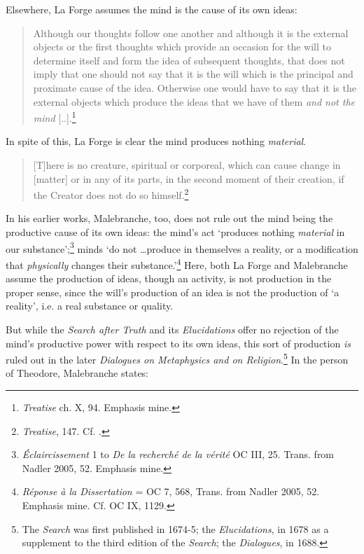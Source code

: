 \documentclass{article}
\begin{document}
Elsewhere, La Forge assumes the mind is the cause of its own ideas:

\begin{quote}
Although our thoughts follow one another and although it is the external
objects or the first thoughts which provide an occasion for the will to
determine itself and form the idea of subsequent thoughts, that does not
imply that one should not say that it is the will which is the principal
and proximate cause of the idea. Otherwise one would have to say that it
is the external objects which produce the ideas that we have of them
\emph{and not the mind} {[}..{]}.\footnote{\emph{Treatise} ch. X, 94.
  Emphasis mine.}
\end{quote}

In spite of this, La Forge is clear the mind produces nothing
\emph{material}.

\begin{quote}
{[}T{]}here is no creature, spiritual or corporeal, which can cause
change in {[}matter{]} or in any of its parts, in the second moment of
their creation, if the Creator does not do so himself.\footnote{\emph{Treatise},
  147. Cf. \autocite{Klima1993}.}
\end{quote}

In his earlier works, Malebranche, too, does not rule out the mind being
the productive cause of its own ideas: the mind's act `produces nothing
\emph{material} in our substance';\footnote{\emph{Éclaircissement} 1 to
  \emph{De la recherché de la vérité} OC III, 25. Trans. from Nadler
  2005, 52. Emphasis mine.} minds `do not \ldots produce in
themselves a reality, or a modification that \emph{physically} changes
their substance.'\footnote{\emph{Réponse à la Dissertation} = OC 7, 568,
  Trans. from Nadler 2005, 52. Emphasis mine. Cf. OC IX, 1129.} Here,
both La Forge and Malebranche assume the production of ideas, though an
activity, is not production in the proper sense, since the will's
production of an idea is not the production of `a reality', i.e. a real
substance or quality.

But while the \emph{Search after Truth} and its \emph{Elucidations}
offer no rejection of the mind's productive power with respect to its
own ideas, this sort of production \emph{is} ruled out in the later
\emph{Dialogues on Metaphysics and on Religion}.\footnote{The
  \emph{Search} was first published in 1674-5; the \emph{Elucidations},
  in 1678 as a supplement to the third edition of the \emph{Search}; the
  \emph{Dialogues}, in 1688.} In the person of Theodore, Malebranche
states:
\end{document}
